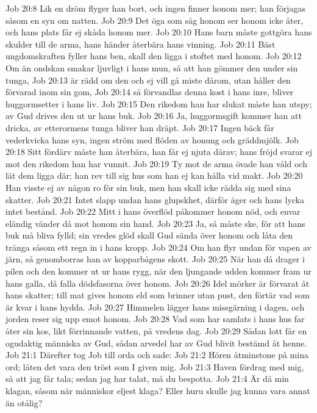 Job 20:8  Lik en dröm flyger han bort, och ingen finner honom mer; han förjagas såsom en syn om natten.
Job 20:9  Det öga som såg honom ser honom icke åter, och hans plats får ej skåda honom mer.
Job 20:10  Hans barn måste gottgöra hans skulder till de arma, hans händer återbära hans vinning.
Job 20:11  Bäst ungdomskraften fyller hans ben, skall den ligga i stoftet med honom.
Job 20:12  Om än ondskan smakar ljuvligt i hans mun, så att han gömmer den under sin tunga,
Job 20:13  är rädd om den och ej vill gå miste därom, utan håller den förvarad inom sin gom,
Job 20:14  så förvandlas denna kost i hans inre, bliver huggormsetter i hans liv.
Job 20:15  Den rikedom han har slukat måste han utspy; av Gud drives den ut ur hans buk.
Job 20:16  Ja, huggormsgift kommer han att dricka, av etterormens tunga bliver han dräpt.
Job 20:17  Ingen bäck får vederkvicka hans syn, ingen ström med flöden av honung och gräddmjölk.
Job 20:18  Sitt fördärv måste han återbära, han får ej njuta därav; hans fröjd svarar ej mot den rikedom han har vunnit.
Job 20:19  Ty mot de arma övade han våld och lät dem ligga där; han rev till sig hus som han ej kan hålla vid makt.
Job 20:20  Han visste ej av någon ro för sin buk, men han skall icke rädda sig med sina skatter.
Job 20:21  Intet slapp undan hans glupskhet, därför äger och hans lycka intet bestånd.
Job 20:22  Mitt i hans överflöd påkommer honom nöd, och envar eländig vänder då mot honom sin hand.
Job 20:23  Ja, så måste ske, för att hans buk må bliva fylld; sin vredes glöd skall Gud sända över honom och låta den tränga såsom ett regn in i hans kropp.
Job 20:24  Om han flyr undan för vapen av järn, så genomborras han av kopparbågens skott.
Job 20:25  När han då drager i pilen och den kommer ut ur hans rygg, när den ljungande udden kommer fram ur hans galla, då falla dödsfasorna över honom.
Job 20:26  Idel mörker är förvarat åt hans skatter; till mat gives honom eld som brinner utan pust, den förtär vad som är kvar i hans hydda.
Job 20:27  Himmelen lägger hans missgärning i dagen, och jorden reser sig upp emot honom.
Job 20:28  Vad som har samlats i hans hus far åter sin kos, likt förrinnande vatten, på vredens dag.
Job 20:29  Sådan lott får en ogudaktig människa av Gud, sådan arvedel har av Gud blivit bestämd åt henne.
Job 21:1  Därefter tog Job till orda och sade:
Job 21:2  Hören åtminstone på mina ord; låten det vara den tröst som I given mig.
Job 21:3  Haven fördrag med mig, så att jag får tala; sedan jag har talat, må du bespotta.
Job 21:4  Är då min klagan, såsom när människor eljest klaga? Eller huru skulle jag kunna vara annat än otålig?

